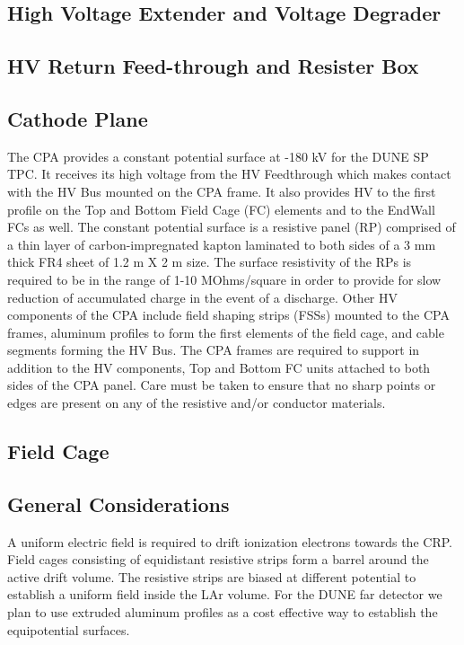 \subsection{High Voltage Extender and Voltage Degrader}

\subsection{HV Return Feed-through and Resister Box}

\subsection{Cathode Plane}
The CPA provides a constant potential surface at -180 kV for the DUNE SP TPC.  It receives its high voltage from the HV Feedthrough which makes contact with the HV Bus mounted on the CPA frame.  It also provides HV to the first profile on the Top and Bottom Field Cage (FC) elements and to the EndWall FCs as well.  The constant potential surface is a resistive panel (RP) comprised of a thin layer of carbon-impregnated kapton laminated to both sides of a 3 mm thick FR4 sheet of 1.2 m X 2 m size.  The surface resistivity of the RPs is required to be in the range of 1-10 MOhms/square in order to provide for slow reduction of accumulated charge in the event of a discharge.  Other HV components of the CPA include field shaping strips (FSSs) mounted to the CPA frames, aluminum profiles to form the first elements of the field cage, and cable segments forming the HV Bus.  The CPA frames are required to support in addition to the HV components, Top and Bottom FC units attached to both sides of the CPA panel.  Care must be taken to ensure that no sharp points or edges are present on any of the resistive and/or conductor materials.  
\subsection{Field Cage}

\subsection{General Considerations}

A uniform electric field is required to drift ionization electrons towards the CRP. Field cages consisting of equidistant resistive strips form a barrel around the active drift volume. The resistive strips are biased at different potential to establish a uniform field inside the LAr volume.
For the DUNE far detector we plan to use extruded aluminum profiles as a cost effective way to establish the equipotential surfaces. 

